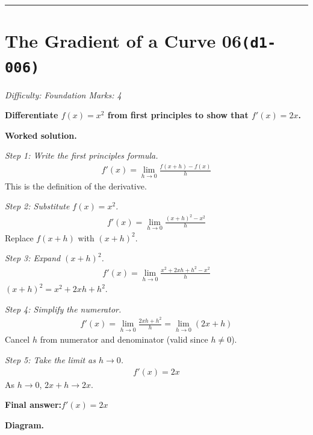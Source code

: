 \documentclass[11pt]{article}
\newcommand{\question}[1]{\par\medskip\noindent\textbf{#1}\par}
\begin{document}
\medskip\hrule

\section*{The Gradient of a Curve 06\quad\small\texttt{(d1-006)}}
\textit{Difficulty: Foundation \quad\textbar\quad Marks: 4}

\question{Differentiate \( f(x) = x^2 \) from first principles to show that \( f'(x) = 2x \).}

\textbf{Worked solution.}

\textit{Step 1: Write the first principles formula.}
\[\begin{gathered}
f'(x) = \lim_{h \to 0} \frac{f(x+h) - f(x)}{h}
\end{gathered}\]
This is the definition of the derivative.

\textit{Step 2: Substitute \( f(x) = x^2 \).}
\[\begin{gathered}
f'(x) = \lim_{h \to 0} \frac{(x+h)^2 - x^2}{h}
\end{gathered}\]
Replace \( f(x+h) \) with \( (x+h)^2 \).

\textit{Step 3: Expand \( (x+h)^2 \).}
\[\begin{gathered}
f'(x) = \lim_{h \to 0} \frac{x^2 + 2xh + h^2 - x^2}{h}
\end{gathered}\]
\( (x+h)^2 = x^2 + 2xh + h^2 \).

\textit{Step 4: Simplify the numerator.}
\[\begin{gathered}
f'(x) = \lim_{h \to 0} \frac{2xh + h^2}{h} = \lim_{h \to 0} (2x + h)
\end{gathered}\]
Cancel \( h \) from numerator and denominator (valid since \( h \neq 0 \)).

\textit{Step 5: Take the limit as \( h \to 0 \).}
\[\begin{gathered}
f'(x) = 2x
\end{gathered}\]
As \( h \to 0 \), \( 2x + h \to 2x \).

\begin{answerbox}
\textbf{Final answer:}\quad \(\displaystyle  f'(x) = 2x \)
\end{answerbox}
\textbf{Diagram.}
\end{document}
